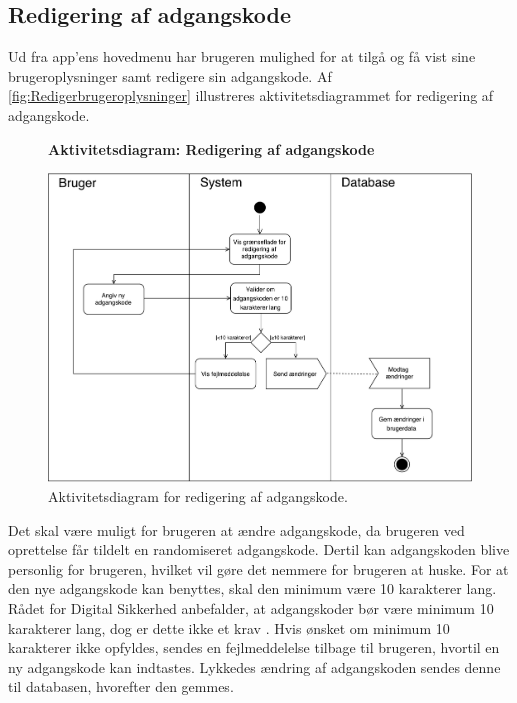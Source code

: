 \subsection*{Redigering af adgangskode} \label{sec:redigrering}
Ud fra app'ens hovedmenu har brugeren mulighed for at tilgå og få vist sine brugeroplysninger samt redigere sin adgangskode. Af \autoref{fig:Redigerbrugeroplysninger} illustreres aktivitetsdiagrammet for redigering af adgangskode.  

\begin{figure}[H]
\centering
\textbf{Aktivitetsdiagram: Redigering af adgangskode}\par\medskip
\includegraphics[width=1\textwidth]{figures/aktivitetsdiagram/Redigerbrugeroplysninger}
\caption{Aktivitetsdiagram for redigering af adgangskode.}
\label{fig:Redigerbrugeroplysninger}
\end{figure}

\noindent
Det skal være muligt for brugeren at ændre adgangskode, da brugeren ved oprettelse får tildelt en randomiseret adgangskode. Dertil kan adgangskoden blive personlig for brugeren, hvilket vil gøre det nemmere for brugeren at huske. 
For at den nye adgangskode kan benyttes, skal den minimum være 10 karakterer lang. Rådet for Digital Sikkerhed anbefalder, at adgangskoder bør være minimum 10 karakterer lang, dog er dette ikke et krav \cite{sikkerhed2015}.
Hvis ønsket om minimum 10 karakterer ikke opfyldes, sendes en fejlmeddelelse tilbage til brugeren, hvortil en ny adgangskode kan indtastes. 
Lykkedes ændring af adgangskoden sendes denne til databasen, hvorefter den gemmes.